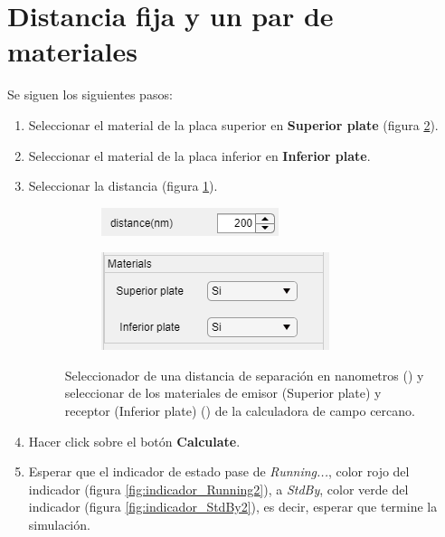 \section{Distancia fija y un par de materiales}
Se siguen los siguientes pasos:
\begin{enumerate}
	\item Seleccionar el material de la placa superior en \textbf{Superior plate} (figura \ref{unParMat}). 
	\item Seleccionar el material de la placa inferior en \textbf{Inferior plate}.
	\item Seleccionar la distancia (figura \ref{unaDistancia}). 
\begin{figure}[H]
\centering
\begin{subfigure}[b]{.48\textwidth}
	\centering
		\includegraphics{figuras/unaDistancia.PNG}
	\caption{ }
	\label{unaDistancia}
\end{subfigure} \hfill
\begin{subfigure}[b]{.48\textwidth}
	\centering
		\includegraphics{figuras/unParMat.PNG}
		\caption{ }
	\label{unParMat}
\end{subfigure}
\caption{Seleccionador de una distancia de separación en nanometros () y seleccionar de los materiales de emisor (Superior plate) y receptor (Inferior plate) () de la calculadora de campo cercano.}
\label{fig:sencillo}
\end{figure}	
	\item Hacer click sobre el botón \textbf{Calculate}.
	\item Esperar que el indicador de estado pase de \textit{Running...}, color rojo del indicador (figura \ref{fig:indicador_Running2}), a \textit{StdBy}, color verde del indicador (figura \ref{fig:indicador_StdBy2}), es decir, esperar que termine la simulación.
	\end{enumerate}
